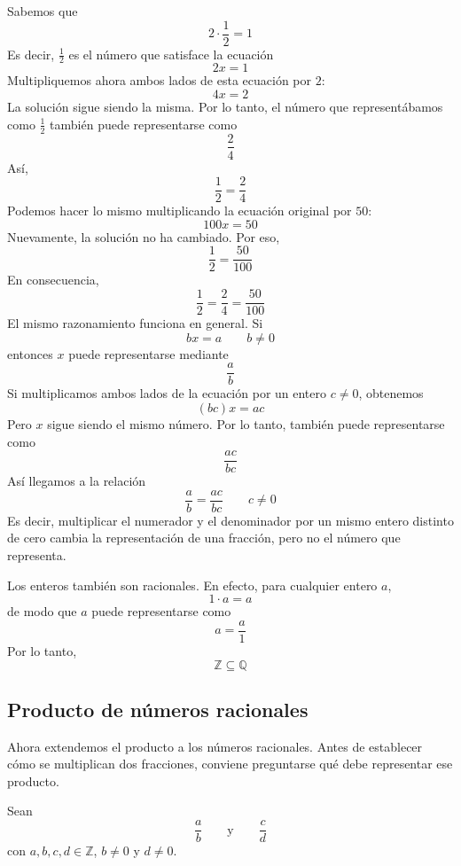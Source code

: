 Sabemos que
\[
2\cdot\frac12=1
\]
Es decir, \(\frac12\) es el número que satisface la ecuación
\[
2x=1
\]
Multipliquemos ahora ambos lados de esta ecuación por \(2\):
\[
4x=2
\]
La solución sigue siendo la misma. Por lo tanto, el número que representábamos como \(\frac12\) también puede representarse como
\[
\frac24
\]
Así,
\[
\frac12=\frac24
\]
Podemos hacer lo mismo multiplicando la ecuación original por \(50\):
\[
100x=50
\]
Nuevamente, la solución no ha cambiado. Por eso,
\[
\frac12=\frac{50}{100}
\]
En consecuencia,
\[
\frac12=\frac24=\frac{50}{100}
\]
El mismo razonamiento funciona en general. Si
\[
bx=a
\qquad b\ne0
\]
entonces \(x\) puede representarse mediante
\[
\frac{a}{b}
\]
Si multiplicamos ambos lados de la ecuación por un entero \(c\ne0\), obtenemos
\[
(bc)x=ac
\]
Pero \(x\) sigue siendo el mismo número. Por lo tanto, también puede representarse como
\[
\frac{ac}{bc}
\]
Así llegamos a la relación
\[
\boxed{
\frac{a}{b}
=
\frac{ac}{bc}
}
\qquad c\ne0
\]
Es decir, multiplicar el numerador y el denominador por un mismo entero distinto de cero cambia la representación de una fracción, pero no el número que representa.

Los enteros también son racionales. En efecto, para cualquier entero \(a\),
\[
1\cdot a=a
\]
de modo que \(a\) puede representarse como
\[
a=\frac{a}{1}
\]
Por lo tanto,
\[
\mathbb{Z}\subseteq\mathbb{Q}
\]

\subsection{Producto de números racionales}

Ahora extendemos el producto a los números racionales. Antes de establecer cómo se multiplican dos fracciones, conviene preguntarse qué debe representar ese producto.

Sean
\[
\frac{a}{b}
  \qquad\text{y}\qquad
  \frac{c}{d}
\]
con \(a,b,c,d\in\mathbb{Z}\), \(b\ne0\) y \(d\ne0\).

